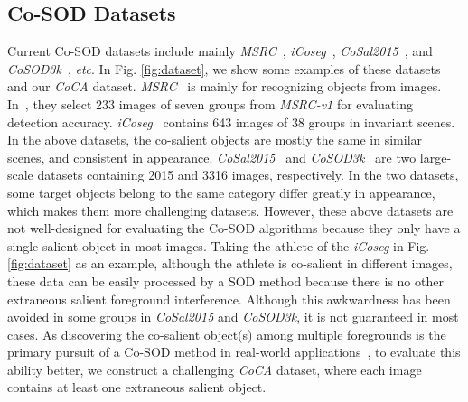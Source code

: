 \documentclass[runningheads,orivec]{llncs}
\newcommand{\figref}[1]{Fig. \ref{#1}}
\def\etc{\emph{etc}}
\begin{document}
\subsection{Co-SOD Datasets}
Current Co-SOD datasets include mainly \textit{MSRC}~\cite{winn2005object}, \textit{iCoseg}~\cite{batra2010icoseg}, 
\textit{CoSal2015}~\cite{zhang2016CoSal}, and \textit{CoSOD3k}~\cite{fan2020taking}, \etc.
In \figref{fig:dataset},
we show some examples of these datasets and our \textit{CoCA} dataset.
\textit{MSRC}~\cite{winn2005object} is mainly for recognizing objects from images.
In~\cite{fu2013cluster,zhang2016CoSal}, they select 233 images of seven groups from \textit{MSRC-v1} for evaluating detection accuracy.
\textit{iCoseg}~\cite{batra2010icoseg} contains 643 images of 38 groups in invariant scenes. 
In the above datasets, 
the co-salient objects are mostly the same in similar scenes, 
and consistent in appearance.
\textit{CoSal2015}~\cite{zhang2016CoSal} and \textit{CoSOD3k}~\cite{fan2020taking} are two large-scale datasets containing 2015 and 3316 images, respectively.
In the two datasets, some target objects belong to the same category differ greatly in appearance, which makes them more challenging datasets.
However, these above datasets are not well-designed for evaluating the Co-SOD algorithms
because they only have a single salient object in most images.
Taking the athlete of the \textit{iCoseg} in \figref{fig:dataset} as an example, 
although the athlete is co-salient in different images, 
these data can be easily processed by a SOD method
because there is no other extraneous salient foreground interference.
Although this awkwardness has been avoided in some groups in \textit{CoSal2015} and \textit{CoSOD3k}, it is not guaranteed in most cases.
As discovering the co-salient object(s) among multiple foregrounds is the primary pursuit of a Co-SOD method in real-world applications~\cite{zhang2018review},
to evaluate this ability better,
we construct a challenging \textsl{CoCA} dataset, 
where each image contains at least one extraneous salient object.
\end{document}
